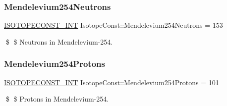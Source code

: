 \subsubsection{\texorpdfstring{Mendelevium254\+Neutrons}{Mendelevium254Neutrons}}
{\footnotesize\ttfamily \mbox{\hyperlink{group___isotope_const-_macros_ga5f18360b3e99483a35c32d789e62621c}{I\+S\+O\+T\+O\+P\+E\+C\+O\+N\+S\+T\+\_\+\+I\+NT}} Isotope\+Const\+::\+Mendelevium254\+Neutrons = 153}

\$ \$ Neutrons in Mendelevium-\/254. \mbox{\label{group___isotope_const-_mendelevium-_md254_ga92cba6cd190a426165e9895a3a55fd61}} 
\subsubsection{\texorpdfstring{Mendelevium254\+Protons}{Mendelevium254Protons}}
{\footnotesize\ttfamily \mbox{\hyperlink{group___isotope_const-_macros_ga5f18360b3e99483a35c32d789e62621c}{I\+S\+O\+T\+O\+P\+E\+C\+O\+N\+S\+T\+\_\+\+I\+NT}} Isotope\+Const\+::\+Mendelevium254\+Protons = 101}

\$ \$ Protons in Mendelevium-\/254. 